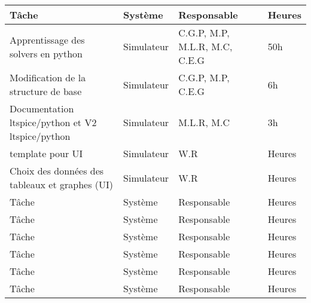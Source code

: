 \begin{tabularx}{\linewidth}{
    |>{\hsize=2.5\hsize}X|%
    >{\hsize=0.5\hsize}X|%
    >{\hsize=0.75\hsize}X|%
    >{\hsize=0.25\hsize}X|%
  }
    \hline
    \textbf{Tâche} & \textbf{Système} & \textbf{Responsable} & \textbf{Heures}\\\hline
     Apprentissage des solvers en python & Simulateur & C.G.P, M.P, M.L.R, M.C, C.E.G & 50h\\\hline
     Modification de la structure de base   & Simulateur &  C.G.P, M.P, C.E.G & 6h\\\hline
     Documentation ltspice/python et V2 ltspice/python  & Simulateur & M.L.R, M.C & 3h\\\hline
     template pour UI & Simulateur & W.R & Heures\\\hline
     Choix des données des tableaux et graphes  (UI) & Simulateur & W.R & Heures\\\hline
     Tâche & Système & Responsable & Heures\\\hline
     Tâche & Système & Responsable & Heures\\\hline
     Tâche & Système & Responsable & Heures\\\hline
     Tâche & Système & Responsable & Heures\\\hline
     Tâche & Système & Responsable & Heures\\\hline
     Tâche & Système & Responsable & Heures\\\hline
  \end{tabularx}

%
%
%  